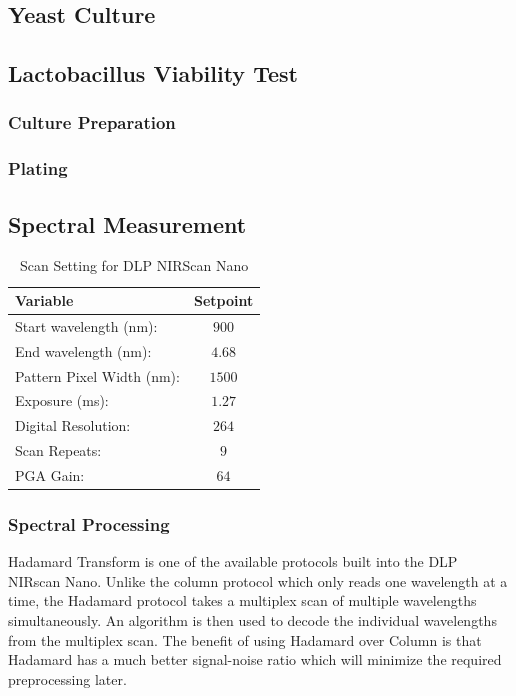 \documentclass[12pt]{report}
\begin{document}
\subsection{Yeast Culture}

\subsection{Lactobacillus Viability Test}

\subsubsection{Culture Preparation}

\subsubsection{Plating}

\subsection{Spectral Measurement}

\begin{table}
    \centering
        \begin{tabular}{l c}
        \toprule
        Variable & Setpoint\\
        \midrule
        Start wavelength (nm): & $900$ \\
        End wavelength (nm): & $4.68$ \\
        Pattern Pixel Width (nm): & $1500$ \\
        Exposure (ms): & $1.27$ \\
        Digital Resolution: & $264$ \\
        Scan Repeats: & $9$ \\
        PGA Gain: & $64$ \\
        \bottomrule
        \end{tabular}
        \caption{Scan Setting for DLP NIRScan Nano}
        \label{tab:scaninfo}
\end{table}

\subsubsection{Spectral Processing}

Hadamard Transform is one of the available protocols built into the DLP NIRscan Nano. Unlike the column protocol which only reads one wavelength at a time, the Hadamard protocol takes a multiplex scan of multiple wavelengths simultaneously. An algorithm is then used to decode the individual wavelengths from the multiplex scan. The benefit of using Hadamard over Column is that Hadamard has a much better signal-noise ratio which will minimize the required preprocessing later.
\end{document}
